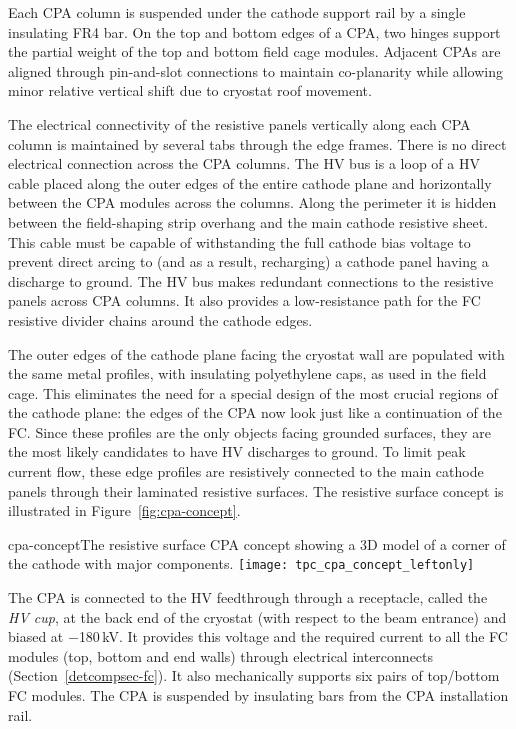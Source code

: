 Each CPA column is suspended under the cathode support rail by a single insulating FR4 bar.  On the top and bottom edges of a CPA, two hinges support the partial weight of the top and bottom field cage modules.   Adjacent CPAs are aligned through pin-and-slot connections to maintain co-planarity while allowing minor relative vertical shift due to cryostat roof movement.

The electrical connectivity of the resistive panels vertically along each CPA column is maintained by several tabs through the edge frames.  There is no direct electrical connection across the CPA columns. 
The HV bus is a loop of a HV cable placed along the outer edges of the entire cathode plane and horizontally between the CPA modules across the columns. Along the perimeter it is hidden between the field-shaping strip overhang and the main cathode resistive sheet.  This cable must be capable of withstanding the full cathode bias voltage to prevent direct arcing to (and as a result, recharging) a cathode panel having a discharge to ground. 
The HV bus makes redundant connections to the resistive panels across CPA columns.  It also provides a low-resistance path for the FC resistive divider chains around the cathode edges.

The outer edges of the cathode plane facing the cryostat wall are populated with the same metal profiles, with insulating polyethylene caps, as used in the field cage.  This eliminates the need for a special design of the most crucial regions of the cathode plane: the edges of the CPA now look just like a continuation of the FC.  Since these profiles are the only objects facing grounded surfaces, they are the most likely candidates to have HV discharges to ground.   To limit peak current flow, these edge profiles are resistively connected to the main cathode panels through their laminated resistive surfaces.  The resistive surface concept is illustrated in Figure~\ref{fig:cpa-concept}.

\begin{cdrfigure}{cpa-concept}{The resistive surface CPA concept showing  
 a 3D model of a corner of the cathode with major components.} 
\texttt{[image: tpc\_cpa\_concept\_leftonly]}
\end{cdrfigure}

The CPA is connected to the HV feedthrough through a receptacle, called the \textit{HV cup}, at the back end of the cryostat (with respect to the beam entrance) and biased at $-$180\,kV.   It provides this voltage and the required current to all the FC modules (top, bottom and end walls) through electrical interconnects (Section~\ref{detcompsec-fc}).  It also mechanically supports six pairs of top/bottom FC modules. The CPA is suspended by insulating bars from the CPA installation rail.



